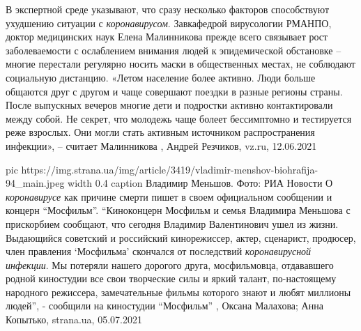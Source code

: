 В экспертной среде указывают, что сразу несколько факторов способствуют
ухудшению ситуации с \emph{коронавирусом}. Завкафедрой вирусологии РМАНПО,
доктор медицинских наук Елена Малинникова прежде всего связывает рост
заболеваемости с ослаблением внимания людей к эпидемической обстановке – многие
перестали регулярно носить маски в общественных местах, не соблюдают социальную
дистанцию. «Летом население более активно. Люди больше общаются друг с другом и
чаще совершают поездки в разные регионы страны. После выпускных вечеров многие
дети и подростки активно контактировали между собой. Не секрет, что молодежь
чаще болеет бессимптомно и тестируется реже взрослых. Они могли стать активным
источником распространения инфекции», – считает Малинникова
, Андрей Резчиков, vz.ru, 12.06.2021

\ifcmt
  pic https://img.strana.ua/img/article/3419/vladimir-menshov-biohrafija-94_main.jpeg
	width 0.4
	caption Владимир Меньшов. Фото: РИА Новости 
\fi
О \emph{коронавирусе} как причине смерти пишет в своем официальном сообщении и
концерн \enquote{Мосфильм}. \enquote{Киноконцерн Мосфильм и семья
Владимира Меньшова с прискорбием сообщают, что сегодня Владимир Валентинович
ушел из жизни. Выдающийся советский и российский кинорежиссер, актер,
сценарист, продюсер, член правления \enquote{Мосфильма} скончался от
последствий \emph{коронавирусной инфекции}. Мы потеряли нашего дорогого друга,
мосфильмовца, отдававшего родной киностудии все свои творческие силы и яркий
талант, по-настоящему народного режиссера, замечательные фильмы которого знают
и любят миллионы людей}, - сообщили на киностудии \enquote{Мосфильм}
, 
Оксана Малахова; Анна Копытько, strana.ua, 05.07.2021
